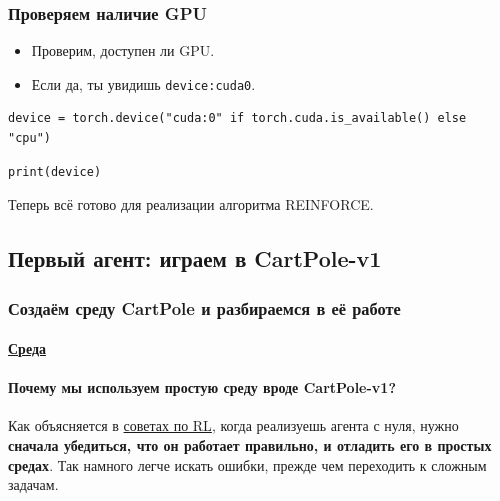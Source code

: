 \documentclass[11pt,a4paper]{article}
\begin{document}
\subsubsection{Проверяем наличие GPU}\label{check-if-we-have-a-gpu}

\begin{itemize}
\tightlist
\item
  Проверим, доступен ли GPU.
\item
  Если да, ты увидишь \texttt{device:cuda0}.
\end{itemize}

\begin{lstlisting}
device = torch.device("cuda:0" if torch.cuda.is_available() else "cpu")
\end{lstlisting}

\begin{lstlisting}
print(device)
\end{lstlisting}

Теперь всё готово для реализации алгоритма REINFORCE.

\subsection{Первый агент: играем в CartPole-v1}\label{first-agent-playing-cartpole-v1}

\subsubsection{Создаём среду CartPole и разбираемся в её работе}\label{create-the-cartpole-environment-and-understand-how-it-works}

\paragraph{\texorpdfstring{\href{https://www.gymlibrary.dev/environments/classic_control/cart_pole/}{Среда}}{Среда}}\label{the-environment}

\paragraph{Почему мы используем простую среду вроде CartPole-v1?}\label{why-do-we-use-a-simple-environment-like-cartpole-v1}

Как объясняется в \href{https://stable-baselines3.readthedocs.io/en/master/guide/rl_tips.html}{советах по RL}, когда реализуешь агента с нуля, нужно \textbf{сначала убедиться, что он работает правильно, и отладить его в простых средах}. Так намного легче искать ошибки, прежде чем переходить к сложным задачам.
\end{document}

